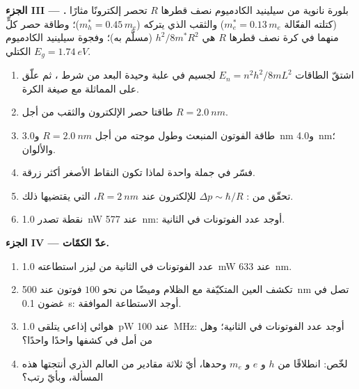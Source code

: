 \begin{problem}
\medskip
\noindent\textbf{الجزء III --- .}
بلورة نانوية من سيلينيد الكادميوم نصف قطرها $R$ تحصر إلكترونًا مثارًا
(كتلته الفعّالة $m_e^\ast = 0.13\,m_e$) والثقب الذي يتركه
($m_h^\ast = 0.45\,m_e$)؛ وطاقة حصر كلٍّ منهما في كرة
نصف قطرها $R$ هي $h^2/8m^\ast R^2$ (مسلَّم به)؛ وفجوة سيلينيد الكادميوم الكتلي
$E_g = \qty{1.74}{eV}$.
\begin{enumerate}[resume]
  \item اشتقّ الطاقات $E_n = n^2h^2/8mL^2$ لجسيم في علبة
        وحيدة البعد من شرط ، ثم
        علّق على المماثلة مع صيغة الكرة.
  \item طاقتا حصر الإلكترون والثقب من أجل
        $R = \qty{2.0}{nm}$.
  \item طاقة الفوتون المنبعث وطول موجته من أجل $R = \qty{2.0}{nm}$
        و\qty{3.0}{nm} و\qty{4.0}{nm}؛ والألوان.
  \item فسّر في جملة واحدة لماذا تكون النقاط الأصغر أكثر زرقة.
  \item تحقّق من  :
        $\Delta p \sim \hbar/R$ للإلكترون عند $R = \qty{2}{nm}$،  التي يقتضيها ذلك.
  \item نقطة تصدر \qty{1.0}{nW} عند \qty{577}{nm}: أوجد عدد الفوتونات في الثانية.
\end{enumerate}

\medskip
\noindent\textbf{الجزء IV --- عدّ الكمّات.}
\begin{enumerate}[resume]
  \item عدد الفوتونات في الثانية من ليزر استطاعته \qty{1.0}{mW} عند \qty{633}{nm}.
  \item تكشف العين المتكيّفة مع الظلام وميضًا من نحو $100$ فوتون عند
        \qty{500}{nm} تصل في غضون \qty{0.1}{s}: أوجد الاستطاعة الموافقة.
  \item هوائي إذاعي يتلقى \qty{1.0}{pW} عند \qty{100}{MHz}: أوجد عدد الفوتونات في
        الثانية؛ وهل من أمل في كشفها واحدًا واحدًا؟
  \item لخّص: انطلاقًا من $h$ و $e$ و $m_e$ وحدها، أيّ ثلاثة مقادير من
        العالم الذري أنتجتها هذه المسألة، وبأيّ
        رتب؟
\end{enumerate}
\end{problem}
